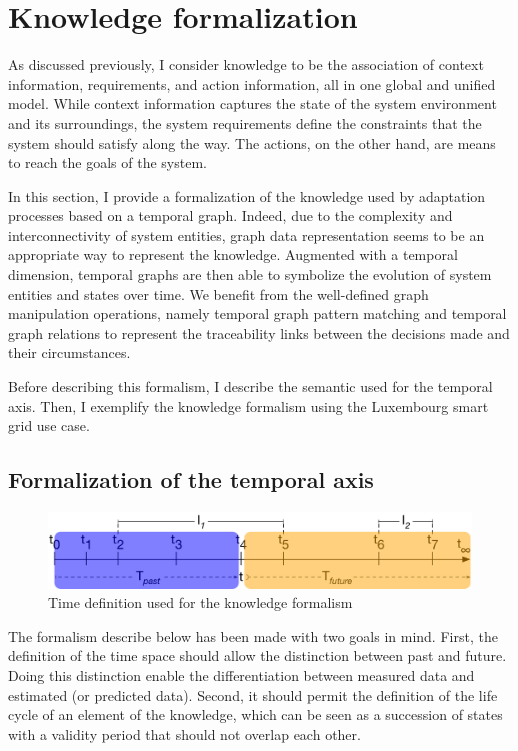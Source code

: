 \section{Knowledge formalization}
\label{sec:tkm:k-formalism}
 
  As discussed previously, I consider \gls{knowledge} to be the association of \gls{context} information, \glspl{requirement}, and \gls{action} information, all in one global and unified model.
 While \gls{context} information captures the state of the system environment and its surroundings, the system \glspl{requirement} define the constraints that the system should satisfy along the way. 
 The \glspl{action}, on the other hand, are means to reach the goals of the system.
  
 In this section, I provide a formalization of the \gls{knowledge} used by adaptation processes based on a temporal graph. 
Indeed, due to the complexity and interconnectivity of system entities, graph data representation seems to be an appropriate way to represent the \gls{knowledge}. 
Augmented with a temporal dimension, temporal graphs are then able to symbolize the evolution of system entities and states over time. 
We benefit from the well-defined graph manipulation operations, namely temporal graph pattern matching and temporal graph relations to represent the traceability links between the \glspl{decision} made and their \glspl{circumstance}.

Before describing this formalism, I describe the semantic used for the temporal axis.
Then, I exemplify the knowledge formalism using the Luxembourg smart grid use case.

\subsection{Formalization of the temporal axis}
\label{sec:tkm:timeDef}

\begin{figure}
   \centering
	\includegraphics[width=\textwidth]{img/chapt-tkm/formalism/formalismeTime}
	\caption{Time definition used for the knowledge formalism}
	\label{fig:tkm:formalismeTime}
\end{figure}

The formalism describe below has been made with two goals in mind.
First, the definition of the time space should allow the distinction between past and future. 
Doing this distinction enable the differentiation between measured data and estimated (or predicted data).
Second, it should permit the definition of the life cycle of an element of the \gls{knowledge}, which can be seen as a succession of states with a validity period that should not overlap each other.

